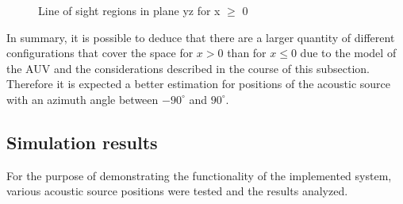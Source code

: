 \begin{figure}[!htbp]
	\captionsetup{justification=centering,margin=2cm}
	\caption{Line of sight regions in plane yz for x $\geq$ 0}
	\label{fig:los-color-b0}
\end{figure}

In summary, it is possible to deduce that there are a larger quantity of different configurations that cover the space for $x>0$ than for $x \leq 0$ due to the model of the AUV and the considerations described in the course of this subsection. Therefore it is expected a better estimation for positions of the acoustic source with an azimuth angle between $-90^{\circ}$ and $90^{\circ}$.

\subsection{Simulation results}


For the purpose of demonstrating the functionality of the implemented system, various acoustic source positions were tested and the results analyzed.

